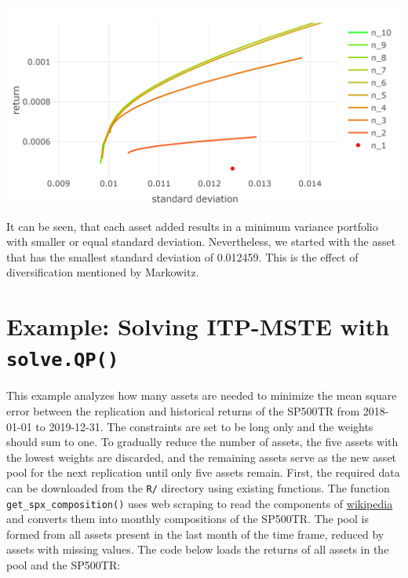 \documentclass[
  oneside]{book}
\begin{document}
\includegraphics{Master_Thesis_files/figure-latex/qp_mvp4-1.png}

It can be seen, that each asset added results in a minimum variance portfolio with smaller or equal standard deviation. Nevertheless, we started with the asset that has the smallest standard deviation of 0.012459. This is the effect of diversification mentioned by Markowitz.

\hypertarget{exampleitpsolveqp}{%
\section{\texorpdfstring{Example: Solving ITP-MSTE with \texttt{solve.QP()}}{Example: Solving ITP-MSTE with solve.QP()}}\label{exampleitpsolveqp}}

This example analyzes how many assets are needed to minimize the mean square error between the replication and historical returns of the SP500TR from 2018-01-01 to 2019-12-31. The constraints are set to be long only and the weights should sum to one. To gradually reduce the number of assets, the five assets with the lowest weights are discarded, and the remaining assets serve as the new asset pool for the next replication until only five assets remain. First, the required data can be downloaded from the \texttt{R/} directory using existing functions. The function \texttt{get\_spx\_composition()} uses web scraping to read the components of \href{https://en.wikipedia.org/wiki/List_of_S\%26P_500_companies}{wikipedia} and converts them into monthly compositions of the SP500TR. The pool is formed from all assets present in the last month of the time frame, reduced by assets with missing values. The code below loads the returns of all assets in the pool and the SP500TR:
\end{document}
